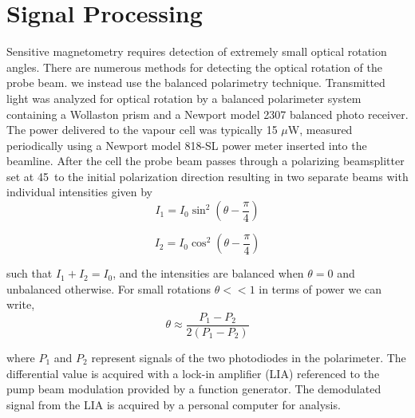 \section{Signal Processing\label{sec:Signal Processing}}
Sensitive magnetometry requires detection of extremely small optical rotation angles. There are numerous methods for detecting the optical rotation of the probe beam.  we instead use the balanced polarimetry technique.  Transmitted light was analyzed for optical rotation by a balanced polarimeter system containing a Wollaston prism and a Newport model 2307 balanced photo receiver. The power delivered to the vapour cell was typically 15 $\mu$W, measured periodically using a Newport model 818-SL power meter inserted into the
beamline. After the cell the probe beam passes through a polarizing beamsplitter set at 45\degree~to the initial polarization direction resulting in two separate beams with individual intensities given by 
\begin{equation}
I_1 = I_0\sin^2(\theta-\frac{\pi}{4})
\end{equation}

\begin{equation}
I_2 = I_0 \cos^2(\theta-\frac{\pi}{4})   
\end{equation}

such that $I_1 + I_2 = I_0$, and the intensities are balanced when $\theta = 0$ and unbalanced otherwise. 
For small rotations $\theta << 1$ in terms of power we can write,
\begin{equation}
  \theta \approx \frac{P_1-P_2}{2(P_1-P_2)}  
\end{equation}

where $P_1$ and $P_2$ represent signals of the two photodiodes in the polarimeter. The differential value is acquired with a lock-in amplifier (LIA) referenced to the pump beam modulation provided by a function generator. The demodulated signal from the LIA is acquired by a personal computer for analysis. 

